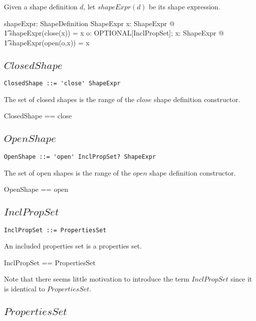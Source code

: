\documentclass{article}
\begin{document}
Given a shape definition $d$, let $shapeExpr(d)$ be its shape expression.
\begin{axdef}
	shapeExpr: ShapeDefinition \fun ShapeExpr
\where
	\forall x: ShapeExpr @ \\
\t1		shapeExpr(close(x)) = x
\also
	\forall o: OPTIONAL[InclPropSet]; x: ShapeExpr @ \\
\t1		shapeExpr(open(o,x)) = x
\end{axdef}

\subsection{$ClosedShape$}

\begin{verbatim}
ClosedShape ::= 'close' ShapeExpr
\end{verbatim}

The set of closed shapes is the range of the $close$ shape definition constructor.
\begin{zed}
	ClosedShape == \ran close
\end{zed}

\subsection{$OpenShape$}

\begin{verbatim}
OpenShape ::= 'open' InclPropSet? ShapeExpr
\end{verbatim}

The set of open shapes is the range of the $open$ shape definition constructor.
\begin{zed}
	OpenShape == \ran open
\end{zed}

\subsection{$InclPropSet$}

\begin{verbatim}
InclPropSet ::= PropertiesSet
\end{verbatim}

An included properties set is a properties set.
\begin{zed}
	InclPropSet == PropertiesSet
\end{zed}
Note that there seems little motivation to introduce the term $InclPropSet$ since it is identical to $PropertiesSet$.

\subsection{$PropertiesSet$}
\end{document}
